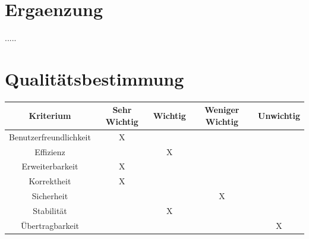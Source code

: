 \documentclass{article}
\begin{document}
\section{Ergaenzung}
..... 

\section{Qualitätsbestimmung}
\begin{tabular}{|c|c|c|c|c|}
\hline 
Kriterium & Sehr Wichtig & Wichtig & Weniger Wichtig & Unwichtig \\ 
\hline 
Benutzerfreundlichkeit & X &  &  &  \\ 
\hline 
Effizienz &  & X &  &  \\ 
\hline 
Erweiterbarkeit & X &  &  &  \\ 
\hline 
Korrektheit & X &  &  &  \\ 
\hline 
Sicherheit &  &  & X &  \\ 
\hline 
Stabilität &  & X &  &  \\ 
\hline 
Übertragbarkeit &  &  &  & X \\ 
\hline 
\end{tabular} 
\end{document}
